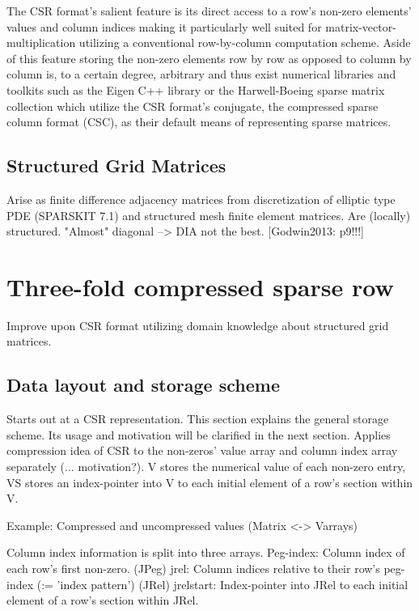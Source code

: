 \documentclass{article}
\begin{document}
    The CSR format's salient feature is its direct access to a row's non-zero elements' values and column indices making
    it particularly well suited for matrix-vector-multiplication utilizing a conventional row-by-column computation
    scheme. Aside of this feature storing the non-zero elements row by row as opposed to column by column is, to a
    certain degree, arbitrary and thus exist numerical libraries and toolkits such as the Eigen C++ library
    \cite{eigen:website} or the Harwell-Boeing sparse matrix collection \cite{harwell-boeing} which utilize the CSR
    format's conjugate, the compressed sparse column format (CSC), as their default means of representing sparse
    matrices.

  \subsection{Structured Grid Matrices}
    Arise as finite difference adjacency matrices from discretization of elliptic type PDE (SPARSKIT 7.1)
      and structured mesh finite element matrices.
    Are (locally) structured.
    "Almost" diagonal --> DIA not the best. [Godwin2013: p9!!!]

\section{Three-fold compressed sparse row}
  Improve upon CSR format utilizing domain knowledge about structured grid matrices.

  \subsection{Data layout and storage scheme}
    Starts out at a CSR representation. This section explains the general storage scheme. Its usage and motivation will be clarified in the next section.
    Applies compression idea of CSR to the non-zeros' value array and column index array separately (... motivation?).
    V stores the numerical value of each non-zero entry, VS stores an index-pointer into V to each initial element of a row's section within V.

      Example: Compressed and uncompressed values (Matrix <-> Varrays)

    Column index information is split into three arrays.
    Peg-index: Column index of each row's first non-zero. (JPeg)
    jrel: Column indices relative to their row's peg-index (:= 'index pattern') (JRel)
    jrelstart: Index-pointer into JRel to each initial element of a row's section within JRel.
\end{document}
